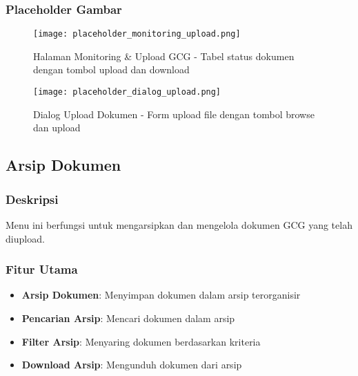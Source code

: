 \documentclass[12pt,a4paper]{article}
\begin{document}
\subsubsection{Placeholder Gambar}
\begin{figure}[H]
    \centering
    \texttt{[image: placeholder\_monitoring\_upload.png]}
    \caption{Halaman Monitoring \& Upload GCG - Tabel status dokumen dengan tombol upload dan download}
    \label{fig:monitoring_upload}
\end{figure}

\begin{figure}[H]
    \centering
    \texttt{[image: placeholder\_dialog\_upload.png]}
    \caption{Dialog Upload Dokumen - Form upload file dengan tombol browse dan upload}
    \label{fig:dialog_upload}
\end{figure}

\newpage

\subsection{Arsip Dokumen}

\subsubsection{Deskripsi}
Menu ini berfungsi untuk mengarsipkan dan mengelola dokumen GCG yang telah diupload.

\subsubsection{Fitur Utama}
\begin{itemize}
    \item \textbf{Arsip Dokumen}: Menyimpan dokumen dalam arsip terorganisir
    \item \textbf{Pencarian Arsip}: Mencari dokumen dalam arsip
    \item \textbf{Filter Arsip}: Menyaring dokumen berdasarkan kriteria
    \item \textbf{Download Arsip}: Mengunduh dokumen dari arsip
\end{itemize}
\end{document}
